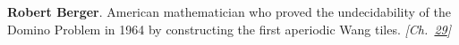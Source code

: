\textbf{Robert Berger}. American mathematician who proved the undecidability of the Domino Problem in 1964 by constructing the first aperiodic Wang tiles. \emph{[Ch.~\hyperref[ch:hatmonotile]{29}]}

